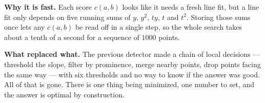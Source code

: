 \documentclass[11pt]{article}
\begin{document}
\textbf{Why it is fast.} Each score $c(a,b)$ looks like it needs a fresh line
fit, but a line fit only depends on five running sums of $y$, $y^2$, $ty$, $t$
and $t^2$. Storing those sums once lets any $c(a,b)$ be read off in a single
step, so the whole search takes about a tenth of a second for a sequence of
$1000$ points.

\textbf{What replaced what.} The previous detector made a chain of local
decisions --- threshold the slope, filter by prominence, merge nearby points,
drop points facing the same way --- with six thresholds and no way to know if
the answer was good. All of that is gone. There is one thing being minimized,
one number to set, and the answer is optimal by construction.
\end{document}
